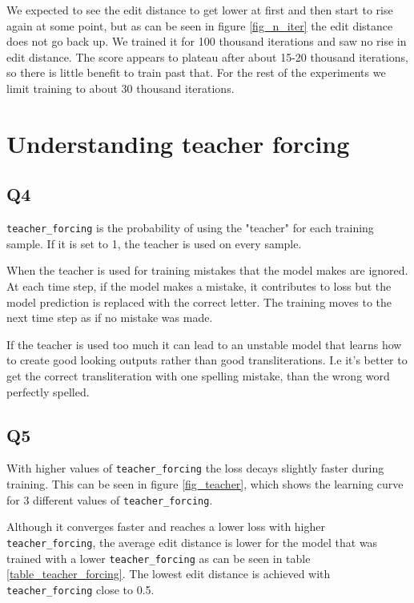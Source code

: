 \documentclass[12pt]{article}
\begin{document}
We expected to see the edit distance to get lower at first and then start to rise again at some point, but as can be seen in figure \ref{fig_n_iter} the edit distance does not go back up. We trained it for 100 thousand iterations and saw no rise in edit distance. The score appears to plateau after about 15-20 thousand iterations, so there is little benefit to train past that. For the rest of the experiments we limit training to about 30 thousand iterations.

\section{Understanding teacher forcing}

\subsection{Q4}

\texttt{teacher\_forcing} is the probability of using the "teacher" for each training sample. If it is set to 1, the teacher is used on every sample.

When the teacher is used for training mistakes that the model makes are ignored. At each time step, if the model makes a mistake, it contributes to loss but the model prediction is replaced with the correct letter. The training moves to the next time step as if no mistake was made.

If the teacher is used too much it can lead to an unstable model that learns how to create good looking outputs rather than good transliterations. I.e it's better to get the correct transliteration with one spelling mistake, than the wrong word perfectly spelled.

\subsection{Q5}
 
With higher values of \texttt{teacher\_forcing} the loss decays slightly faster during training. This can be seen in figure \ref{fig_teacher}, which shows the learning curve for 3 different values of \texttt{teacher\_forcing}.

Although it converges faster and reaches a lower loss with higher \texttt{teacher\_forcing}, the average edit distance is lower for the model that was trained with a lower \texttt{teacher\_forcing} as can be seen in table \ref{table_teacher_forcing}. The lowest edit distance is achieved with \texttt{teacher\_forcing} close to 0.5.
\end{document}
